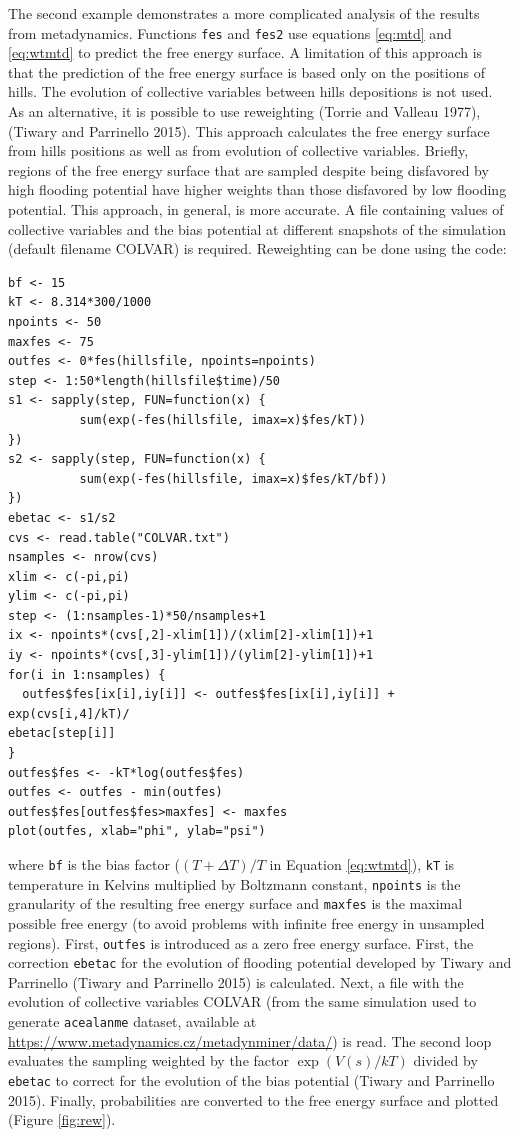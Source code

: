 The second example demonstrates a more complicated analysis of the
results from metadynamics. Functions \texttt{fes} and \texttt{fes2} use equations
\eqref{eq:mtd} and \eqref{eq:wtmtd} to predict the free energy surface. A limitation
of this approach is that the prediction of the free energy surface is
based only on the positions of hills. The evolution of collective variables between
hills depositions is not used. As an alternative, it is possible to use
reweighting (Torrie and Valleau 1977),(Tiwary and Parrinello 2015). This approach calculates the free
energy surface from hills positions as well as from evolution of collective
variables. Briefly, regions of the free energy surface that are sampled
despite being disfavored by high flooding potential have higher weights than those
disfavored by low flooding potential. This approach, in general, is more accurate.
A file containing values of collective variables
and the bias potential at different snapshots of the simulation
(default filename COLVAR) is required.
Reweighting can be done using the code:

\begin{verbatim}
bf <- 15
kT <- 8.314*300/1000
npoints <- 50
maxfes <- 75
outfes <- 0*fes(hillsfile, npoints=npoints)
step <- 1:50*length(hillsfile$time)/50
s1 <- sapply(step, FUN=function(x) {
          sum(exp(-fes(hillsfile, imax=x)$fes/kT))
})
s2 <- sapply(step, FUN=function(x) {
          sum(exp(-fes(hillsfile, imax=x)$fes/kT/bf))
})
ebetac <- s1/s2
cvs <- read.table("COLVAR.txt")
nsamples <- nrow(cvs)
xlim <- c(-pi,pi)
ylim <- c(-pi,pi)
step <- (1:nsamples-1)*50/nsamples+1
ix <- npoints*(cvs[,2]-xlim[1])/(xlim[2]-xlim[1])+1
iy <- npoints*(cvs[,3]-ylim[1])/(ylim[2]-ylim[1])+1
for(i in 1:nsamples) {
  outfes$fes[ix[i],iy[i]] <- outfes$fes[ix[i],iy[i]] + exp(cvs[i,4]/kT)/
ebetac[step[i]]
}
outfes$fes <- -kT*log(outfes$fes)
outfes <- outfes - min(outfes)
outfes$fes[outfes$fes>maxfes] <- maxfes
plot(outfes, xlab="phi", ylab="psi")
\end{verbatim}

where \texttt{bf} is the bias factor (\((T+\Delta T)/T\) in Equation \eqref{eq:wtmtd}),
\texttt{kT} is temperature in Kelvins multiplied by Boltzmann constant,
\texttt{npoints} is the granularity of the resulting free energy surface
and \texttt{maxfes} is the maximal possible free energy (to avoid problems
with infinite free energy in unsampled regions).
First, \texttt{outfes} is introduced as a zero
free energy surface. First, the correction \texttt{ebetac} for the
evolution of flooding potential developed by Tiwary and Parrinello
(Tiwary and Parrinello 2015) is calculated.
Next, a file with the evolution of collective variables
COLVAR (from the same simulation used to generate \texttt{acealanme}
dataset, available at \url{https://www.metadynamics.cz/metadynminer/data/})
is read. The second loop evaluates the sampling weighted by the factor
\(\exp (V(s)/kT)\) divided by \texttt{ebetac} to correct for the evolution of
the bias potential (Tiwary and Parrinello 2015). Finally, probabilities are converted
to the free energy surface and plotted (Figure \ref{fig:rew}).

